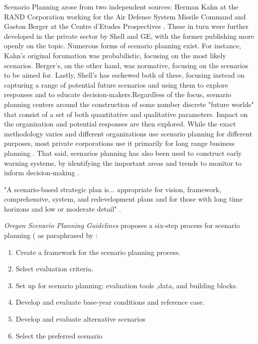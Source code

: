 Scenario Planning arose from two independent sources: Herman Kahn at the RAND Corporation working for the Air Defense System Missile Command and Gaston Berger at the Centre d'Etudes Prospectives \cite{bradfieldOriginsEvolutionScenario2005}. These in turn were further developed in the private sector by Shell and GE, with the former publishing more openly on the topic. Numerous forms of scenario planning exist. For instance, Kahn's original forumation was probabilistic, focusing on the most likely scenarios. Berger's, on the other hand, was normative, focusing on the scenarios to be aimed for. Lastly, Shell's has eschewed both of these, focusing instead on capturing a range of potential future scenarios and using them to explore responses and to educate decision-makers.Regardless of the focus, scenario planning centers around the construction of some number discrete "future worlds" that consist of a set of both quantitative and qualitative parameters. Impact on the organization and potential responses are then explored. While the exact methodology varies and different organizations use scenario planning for different purposes, most private corporations use it primarily for long range business planning \cite{bradfieldOriginsEvolutionScenario2005}. That said, scenarios planning has also been used to construct early warning systems, by identifying the important areas and trends to monitor to inform decision-making \cite{tessunScenarioAnalysisEarly1997}.

"A scenario-based strategic plan is... appropriate for vision, framework, comprehensive, system, and redevelopment plans and for those with long time horizons and low or moderate detail" \cite{goodspeedScenarioPlanningCities2020}. 

\textit{Oregon Scenario Planning Guidelines} proposes a six-step process for scenario planning ( \cite{oregonsustainabletransportationinitiativeScenarioPlanningGuidelines2017} as paraphrased by \cite{goodspeedScenarioPlanningCities2020}:

\begin{enumerate}[itemsep=0pt,parsep=0pt]
	\item{Create a framework for the scenario planning process.}
	\item{Select evaluation criteria.}
	\item{Set up for scenario planning: evaluation tools ,data, and building blocks.}
	\item{Develop and evaluate base-year conditions and reference case.}
	\item{Develop and evaluate alternative scenarios}
	\item{Select the preferred scenario}
\end{enumerate}

